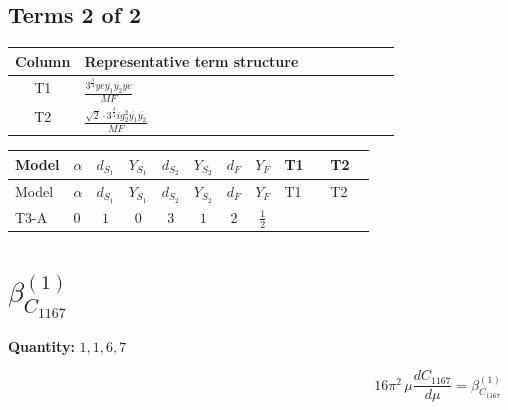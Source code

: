 \documentclass[8pt]{article}
\begin{document}
\begin{landscape}
\subsection*{Terms 2 of 2}
\begin{center}
\begin{tabular}{@{}c >{\raggedright\arraybackslash}p{0.82\linewidth}@{}}
\toprule
Column & Representative term structure \\
\midrule
T1 & \(\displaystyle \frac{3^{\frac{3}{4}} ye \overline{y_{1}} \overline{y_{2}} \overline{ye}}{MF}\) \\
\midrule
T2 & \(\displaystyle \frac{\sqrt{2} \cdot 3^{\frac{3}{4}} i g_{2}^{2} \overline{y_{1}} \overline{y_{2}}}{MF}\) \\
\midrule
\bottomrule
\end{tabular}
\end{center}
\smallskip
\tiny
\begin{longtable}{@{}llcccccc >{\raggedright\arraybackslash}p{0.21\linewidth} >{\raggedright\arraybackslash}p{0.21\linewidth}@{}}
\toprule
Model & $\alpha$ & $d_{S_1}$ & $Y_{S_1}$ & $d_{S_2}$ & $Y_{S_2}$ & $d_F$ & $Y_F$ & T1 & T2 \\
\midrule
\endfirsthead
\toprule
Model & $\alpha$ & $d_{S_1}$ & $Y_{S_1}$ & $d_{S_2}$ & $Y_{S_2}$ & $d_F$ & $Y_F$ & T1 & T2 \\
\midrule
\endhead
T3-A & $0$ & $1$ & $0$ & $3$ & $1$ & $2$ & $\frac{1}{2}$ & \scriptsize\adjustbox{max width=\linewidth}{$\begin{gathered} - \frac{3^{\frac{3}{4}} ye \overline{y_{1}} \overline{y_{2}} \overline{ye}}{12 MF}\end{gathered}$} & \scriptsize\adjustbox{max width=\linewidth}{$\begin{gathered} \frac{\sqrt{2} \cdot 3^{\frac{3}{4}} i g_{2}^{2} \overline{y_{1}} \overline{y_{2}}}{3 MF}\end{gathered}$} \\
\midrule
\bottomrule
\end{longtable}
\clearpage
\section*{$\beta_{C_{1167}}^{(1)}$}
\noindent\textbf{Quantity: }$\mathrm{1,1,6,7}$\par\smallskip
\[16\pi^2\,\mu\frac{d C_{1167}}{d\mu}=\beta_{C_{1167}}^{(1)}\]

\end{landscape}
\end{document}
